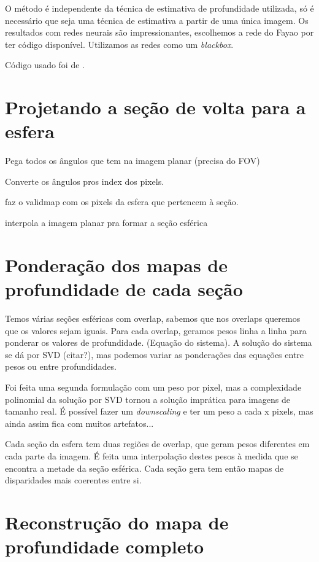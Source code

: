 \documentclass[cic,tc]{iiufrgs}
\begin{document}
O método é independente da técnica de estimativa de profundidade utilizada, só é necessário que seja uma técnica de estimativa a partir de uma única imagem. Os resultados com redes neurais são impressionantes, escolhemos a rede do Fayao por ter código disponível. Utilizamos as redes como um \textit{blackbox}.

Código usado foi de \citet{Fayao2016}.

\section{Projetando a seção de volta para a esfera}

Pega todos os ângulos que tem na imagem planar (precisa do FOV)

Converte os ângulos pros index dos pixels.

faz o validmap com os pixels da esfera que pertencem à seção.

interpola a imagem planar pra formar a seção esférica

\section{Ponderação dos mapas de profundidade de cada seção}

Temos várias seções esféricas com overlap, sabemos que nos overlaps queremos que os valores sejam iguais. Para cada overlap, geramos pesos linha a linha para ponderar os valores de profundidade. (Equação do sistema). A solução do sistema se dá por SVD (citar?), mas podemos variar as ponderações das equações entre pesos ou entre profundidades.

Foi feita uma segunda formulação com um peso por pixel, mas a complexidade polinomial da solução por SVD tornou a solução imprática para imagens de tamanho real. É possível fazer um \textit{downscaling} e ter um peso a cada x pixels, mas ainda assim fica com muitos artefatos...

Cada seção da esfera tem duas regiões de overlap, que geram pesos diferentes em cada parte da imagem. É feita uma interpolação destes pesos à medida que se encontra a metade da seção esférica. Cada seção gera tem então mapas de disparidades mais coerentes entre si.

\section{Reconstrução do mapa de profundidade completo}
\end{document}
